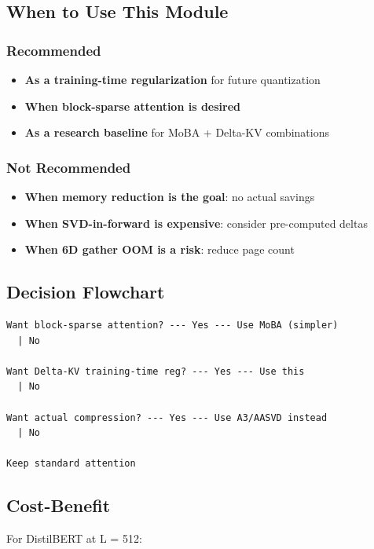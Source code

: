\subsection{When to Use This Module}

\subsubsection{Recommended}
\begin{itemize}
\item \textbf{As a training-time regularization} for future quantization
\item \textbf{When block-sparse attention is desired}
\item \textbf{As a research baseline} for MoBA + Delta-KV combinations

\end{itemize}
\subsubsection{Not Recommended}
\begin{itemize}
\item \textbf{When memory reduction is the goal}: no actual savings
\item \textbf{When SVD-in-forward is expensive}: consider pre-computed deltas
\item \textbf{When 6D gather OOM is a risk}: reduce page count

\end{itemize}
\subsection{Decision Flowchart}

\begin{lstlisting}
Want block-sparse attention? --- Yes --- Use MoBA (simpler)
  | No
   
Want Delta-KV training-time reg? --- Yes --- Use this
  | No
   
Want actual compression? --- Yes --- Use A3/AASVD instead
  | No
   
Keep standard attention
\end{lstlisting}

\subsection{Cost-Benefit}

For DistilBERT at L = 512:

